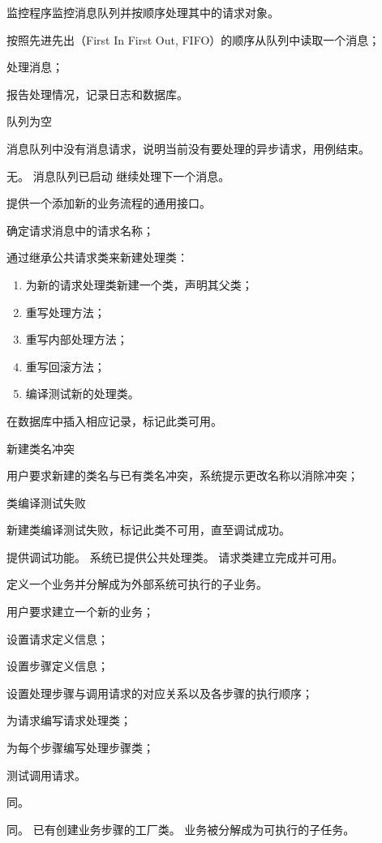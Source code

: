 \documentclass[cs4size,a4paper,nofonts]{ctexart}
\begin{document}
{监控程序监控消息队列并按顺序处理其中的请求对象。} %
{} %
{
\item 按照先进先出（First In First Out, FIFO）的顺序从队列中读取一个消息；
\item 处理消息；
\item 报告处理情况，记录日志和数据库。
} %
{} %
{
\item 队列为空\par
消息队列中没有消息请求，说明当前没有要处理的异步请求，用例结束。
} %
{无。} %
{消息队列已启动} %
{继续处理下一个消息。} %

{提供一个添加新的业务流程的通用接口。} %
{} %
{
\item 确定请求消息中的请求名称；
\item 通过继承公共请求类来新建处理类：
\begin{enumerate}
\item 为新的请求处理类新建一个类，声明其父类；
\item 重写处理方法；
\item 重写内部处理方法；
\item 重写回滚方法；
\item 编译测试新的处理类。
\end{enumerate}
\item 在数据库中插入相应记录，标记此类可用。
} %
{} %
{
\item 新建类名冲突\par
用户要求新建的类名与已有类名冲突，系统提示更改名称以消除冲突；
\item 类编译测试失败\par
新建类编译测试失败，标记此类不可用，直至调试成功。
} %
{提供调试功能。} %
{系统已提供公共处理类。} %
{请求类建立完成并可用。} %

{定义一个业务并分解成为外部系统可执行的子业务。} %
{} %
{
\item 用户要求建立一个新的业务；
\item 设置请求定义信息；
\item 设置步骤定义信息；
\item 设置处理步骤与调用请求的对应关系以及各步骤的执行顺序；
\item 为请求编写请求处理类；
\item 为每个步骤编写处理步骤类；
\item 测试调用请求。
} %
{} %
{
\item 同。
} %
{同。} %
{已有创建业务步骤的工厂类。} %
{业务被分解成为可执行的子任务。} %
\end{document}
